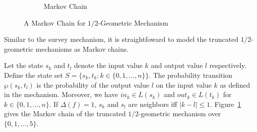 \begin{figure}
\begin{subfigure}{.50\columnwidth}
{
    }
    \caption{Markov Chain}
    \label{figure:geometric-mechanism-markov-chain}
  \end{subfigure}

  \caption{A Markov Chain for $1/2$-Geometric Mechanism}
  \label{figure:geometric-mechanism}
\end{figure}

Similar to the survey mechanism, it is
straightfoward to model the truncated $1/2$-geometric
mechanisms as Markov chains.

\begin{example}
Let the state $s_k$ and $t_l$
denote the input value $k$ and output value $l$ respectively. Define
the state set $S = \{ s_k, t_k : k \in \{ 0, 1, \ldots, n \} \}$.
The probability transition $\wp (s_k, t_l)$ is the probability of the
output value $l$ on the input value $k$ as defined in the
mechanism. Moreover, we have $\mathit{in}_k \in L (s_k)$ and
$\mathit{out}_k \in L (t_k)$ for $k \in \{ 0, 1, \ldots, n \}$.
If $\Delta (f) = 1$, $s_k$ and $s_l$ are
neighbors iff $| k - l | \leq 1$.
Figure~\ref{figure:geometric-mechanism-markov-chain} gives
the Markov chain of the truncated
$1/2$-geometric mechanism over $\{ 0, 1, \ldots, 5 \}$.
\end{example}

